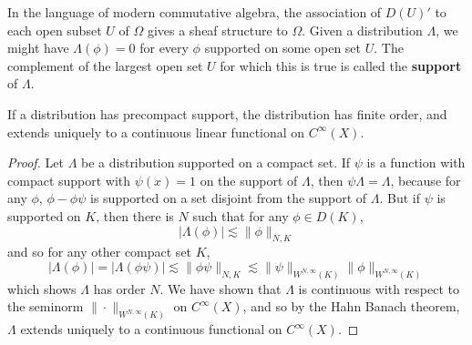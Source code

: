 In the language of modern commutative algebra, the association of $D(U)'$ to each open subset $U$ of $\Omega$ gives a sheaf structure to $\Omega$. Given a distribution $\Lambda$, we might have $\Lambda(\phi) = 0$ for every $\phi$ supported on some open set $U$. The complement of the largest open set $U$ for which this is true is called the {\bf support} of $\Lambda$.

\begin{theorem}
    If a distribution has precompact support, the distribution has finite order, and extends uniquely to a continuous linear functional on $C^\infty(X)$.
\end{theorem}
\begin{proof}
    Let $\Lambda$ be a distribution supported on a compact set. If $\psi$ is a function with compact support with $\psi(x) = 1$ on the support of $\Lambda$, then $\psi \Lambda = \Lambda$, because for any $\phi$, $\phi - \phi \psi$ is supported on a set disjoint from the support of $\Lambda$. But if $\psi$ is supported on $K$, then there is $N$ such that for any $\phi \in D(K)$,
    \[ |\Lambda(\phi)| \lesssim \| \phi \|_{N,K} \]
    and so for any other compact set $K$,
    \[ |\Lambda(\phi)| = |\Lambda(\phi \psi)| \lesssim \| \phi \psi \|_{N,K} \lesssim \| \psi \|_{W^{N,\infty}(K)} \| \phi \|_{W^{N,\infty}(K)} \]
    which shows $\Lambda$ has order $N$. We have shown that $\Lambda$ is continuous with respect to the seminorm $\| \cdot \|_{W^{N,\infty}(K)}$ on $C^\infty(X)$, and so by the Hahn Banach theorem, $\Lambda$ extends uniquely to a continuous functional on $C^\infty(X)$.
\end{proof}


